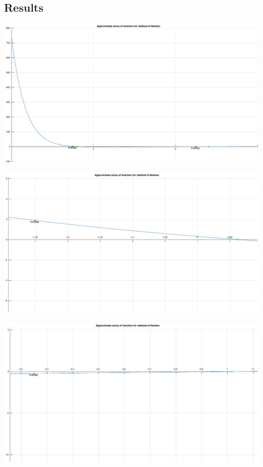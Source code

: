 \documentclass[12pt]{report}
\begin{document}
\subsection{Results}

\begin{center}
   \includegraphics[scale=0.25]{task1Newtonoverall.eps}
\end{center}

\begin{center}
   \includegraphics[scale=0.25]{task1Newtonzommedleft.eps}
\end{center}

\begin{center}
   \includegraphics[scale=0.25]{task1Newtonzommedright.eps}
\end{center}
\end{document}
